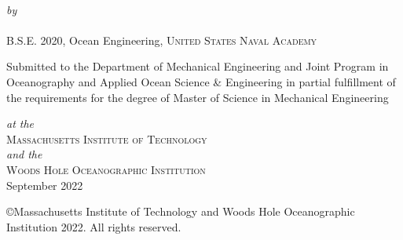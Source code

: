 \def\signature#1#2{\par\noindent#1\dotfill\null\\*
  {\raggedleft #2\par}}


\makeatletter

\begin{titlepage}
  \begin{center}
    \begin{Large}
      \@title
    \end{Large}\\[0.1em]
    \emph{\footnotesize by}\\
    {\large \@author} \\[-0.25em]
    B.S.E. 2020, Ocean Engineering, \textsc{United States Naval Academy} \\ %
    
    \begin{singlespace}
    {Submitted to the Department of Mechanical Engineering and Joint Program in Oceanography and Applied Ocean Science \& Engineering in partial fulfillment of the requirements for the degree of Master of Science in Mechanical Engineering} \\
    \end{singlespace}
     \begin{singlespace}
    \emph{\footnotesize at the}\\
    {\large \textsc{Massachusetts Institute of Technology}} \\
    \emph{\footnotesize and the}\\
    {\large \textsc{Woods Hole Oceanographic Institution}} \\ [1 em]
    September 2022 \\[1em]
    \end{singlespace}
    
    \begin{singlespace}
    {\copyright Massachusetts Institute of Technology and Woods Hole Oceanographic Institution 2022. All rights reserved.} \\ [2em]


\end{singlespace}
\end{center}
\end{titlepage}
